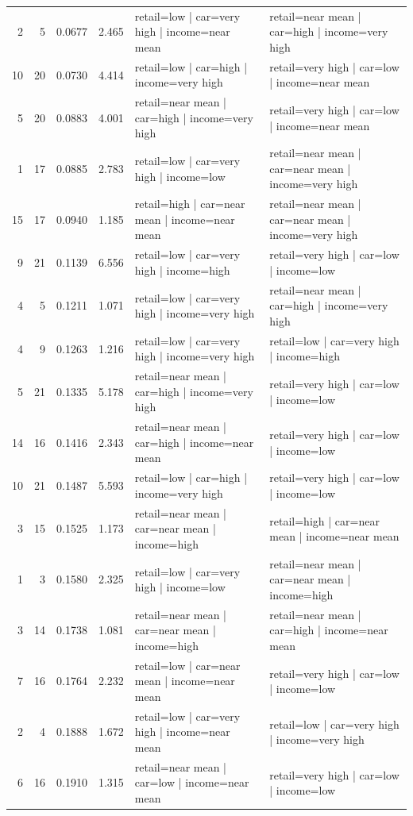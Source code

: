 \documentclass[10pt,a4paper]{article}
\begin{document}
\begin{longtable}{rrrrp{4.25cm}p{4.25cm}}
2 & 5 & 0.0677 & 2.465 & retail=low | car=very high | income=near mean & retail=near mean | car=high | income=very high \\
10 & 20 & 0.0730 & 4.414 & retail=low | car=high | income=very high & retail=very high | car=low | income=near mean \\
5 & 20 & 0.0883 & 4.001 & retail=near mean | car=high | income=very high & retail=very high | car=low | income=near mean \\
1 & 17 & 0.0885 & 2.783 & retail=low | car=very high | income=low & retail=near mean | car=near mean | income=very high \\
15 & 17 & 0.0940 & 1.185 & retail=high | car=near mean | income=near mean & retail=near mean | car=near mean | income=very high \\
9 & 21 & 0.1139 & 6.556 & retail=low | car=very high | income=high & retail=very high | car=low | income=low \\
4 & 5 & 0.1211 & 1.071 & retail=low | car=very high | income=very high & retail=near mean | car=high | income=very high \\
4 & 9 & 0.1263 & 1.216 & retail=low | car=very high | income=very high & retail=low | car=very high | income=high \\
5 & 21 & 0.1335 & 5.178 & retail=near mean | car=high | income=very high & retail=very high | car=low | income=low \\
14 & 16 & 0.1416 & 2.343 & retail=near mean | car=high | income=near mean & retail=very high | car=low | income=low \\
10 & 21 & 0.1487 & 5.593 & retail=low | car=high | income=very high & retail=very high | car=low | income=low \\
3 & 15 & 0.1525 & 1.173 & retail=near mean | car=near mean | income=high & retail=high | car=near mean | income=near mean \\
1 & 3 & 0.1580 & 2.325 & retail=low | car=very high | income=low & retail=near mean | car=near mean | income=high \\
3 & 14 & 0.1738 & 1.081 & retail=near mean | car=near mean | income=high & retail=near mean | car=high | income=near mean \\
7 & 16 & 0.1764 & 2.232 & retail=low | car=near mean | income=near mean & retail=very high | car=low | income=low \\
2 & 4 & 0.1888 & 1.672 & retail=low | car=very high | income=near mean & retail=low | car=very high | income=very high \\
6 & 16 & 0.1910 & 1.315 & retail=near mean | car=low | income=near mean & retail=very high | car=low | income=low \\

\end{longtable}
\end{document}
